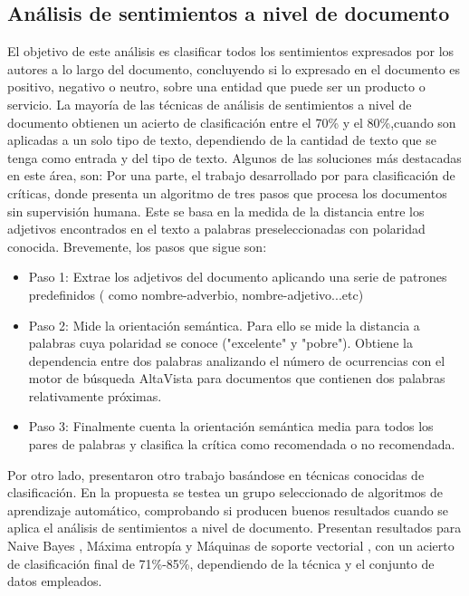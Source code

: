 \subsection{Análisis de sentimientos a nivel de documento}
El objetivo de este análisis es clasificar todos los sentimientos expresados por los autores a lo largo del documento, concluyendo si lo expresado en el documento es positivo, negativo o neutro, sobre una entidad que puede ser un producto o servicio. La mayoría de las técnicas de análisis de sentimientos a nivel de documento obtienen un acierto de clasificación entre el 70\% y el 80\%,cuando son aplicadas a un solo tipo de texto, dependiendo de la cantidad de texto que se tenga como entrada y del tipo de texto. \newline
Algunos de las soluciones más destacadas en este área, son:\newline
Por una parte, el trabajo desarrollado por  \citet{turney2002thumbs} para clasificación de críticas, donde presenta un algoritmo de tres pasos que procesa los documentos sin supervisión humana. Este se basa en la medida de la distancia entre los adjetivos encontrados en el texto a palabras preseleccionadas con polaridad conocida. Brevemente, los pasos que sigue son:\newline
\begin{itemize}
\item Paso 1: Extrae los adjetivos del documento aplicando una serie de patrones predefinidos ( como nombre-adverbio, nombre-adjetivo...etc)
\item Paso 2: Mide la orientación semántica. Para ello se mide la distancia a palabras cuya polaridad se conoce ("excelente" y "pobre"). Obtiene la dependencia entre dos palabras analizando el número de ocurrencias con el motor de búsqueda \textcolor{SchoolColor}{AltaVista} para documentos que contienen dos palabras relativamente próximas. 
\item Paso 3: Finalmente cuenta la orientación semántica media para todos los pares de palabras y  clasifica la crítica como recomendada o no recomendada. 
\end{itemize}

Por otro lado, \citet{pang2002thumbs} presentaron otro trabajo basándose en técnicas conocidas de clasificación. En la propuesta se testea un grupo seleccionado de algoritmos de aprendizaje automático, comprobando si producen buenos resultados cuando se aplica el análisis de sentimientos a nivel de documento.\newline
Presentan resultados para \textsf{Naive Bayes} \citet{lewis1998naive}, \textsf{Máxima entropía} \citet{berger1996maximum} y \textsf{Máquinas de soporte vectorial} \citet{joachims1998text}, con un acierto de clasificación final de 71\%-85\%, dependiendo de la técnica y el conjunto de datos empleados.       





